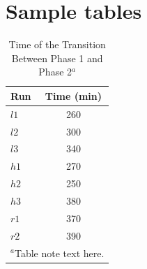 \documentclass[NETN,manuscript]{stjour-new}
\begin{document}
\newpage
\section{Sample tables}

\begin{table}[!ht]
\caption{Time of the Transition Between Phase 1 and Phase 2$^{a}$}
\label{tab:label}
\centering
\begin{tabular}{lc}
\hline
 Run  & Time (min)  \\
\hline
  $l1$  & 260   \\
  $l2$  & 300   \\
  $l3$  & 340   \\
  $h1$  & 270   \\
  $h2$  & 250   \\
  $h3$  & 380   \\
  $r1$  & 370   \\
  $r2$  & 390   \\
\hline
\multicolumn{2}{l}{$^{a}$Table note text here.}
\end{tabular}
\end{table}
\end{document}
